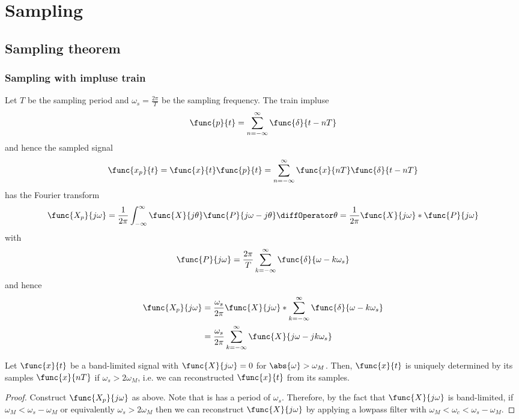 \chapter{Sampling}
\section{Sampling theorem}
\subsection*{Sampling with impluse train}
Let \(T\) be the sampling period and \(\omega_s = \frac{2\pi}{T}\) be the sampling frequency. The train impluse 
\begin{equation*}
    \func{p}{t} = \sum_{n = -\infty}^{\infty} \func{\delta}{t - nT}
\end{equation*}
and hence the sampled signal
\begin{equation*}
    \func{x_p}{t} = \func{x}{t} \func{p}{t} = \sum_{n = -\infty}^{\infty} \func{x}{nT} \func{\delta}{t - nT}
\end{equation*}
has the Fourier transform 
\begin{equation*}
    \func{X_p}{j\omega} = \dfrac{1}{2\pi} \int_{-\infty}^{\infty} \func{X}{j\theta} \func{P}{j\omega - j \theta} \diffOperator \theta = \dfrac{1}{2\pi} \func{X}{j\omega} \ast \func{P}{j\omega}
\end{equation*}
with 
\begin{equation*}
    \func{P}{j\omega} = \dfrac{2\pi}{T} \sum_{k = -\infty}^{\infty} \func{\delta}{\omega - k \omega_s}
\end{equation*}
and hence 
\begin{align*}
    \func{X_p}{j\omega} &= \dfrac{\omega_s}{2\pi} \func{X}{j\omega} \ast \sum_{k = -\infty}^{\infty} \func{\delta}{\omega - k \omega_s}\\
    &= \dfrac{\omega_s}{2\pi}   \sum_{k = -\infty}^{\infty} \func{X}{j\omega - jk\omega_s}
\end{align*}

\begin{theorem}
    Let \(\func{x}{t}\) be a band-limited signal with \(\func{X}{j\omega} = 0\) for \(\abs{\omega} > \omega_M\). Then, \(\func{x}{t}\) is uniquely determined by its samples \(\func{x}{nT}\) if \(\omega_s > 2 \omega_M\), i.e. we can reconstructed \(\func{x}{t}\) from its samples.
\end{theorem}

\begin{proof}
    Construct \(\func{X_p}{j\omega}\) as above. Note that is has a period of \(\omega_s\). Therefore, by the fact that \(\func{X}{j\omega}\) is band-limited, if \(\omega_M < \omega_s - \omega_M\) or equivalently \(\omega_s > 2 \omega_M\) then we can reconstruct \(\func{X}{j\omega}\) by applying a lowpass filter with \(\omega_M < \omega_c < \omega_s - \omega_M\).
\end{proof}

